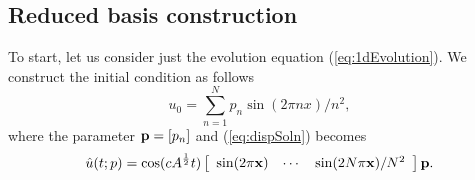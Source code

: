 %
%
%

\subsection{Reduced basis construction}
To start, let us consider just the evolution equation (\ref{eq:1dEvolution}). We construct the initial condition as follows
\begin{equation}
\label{eq:Exp2initcond}
u_0 = \sum_{n=1}^N p_n \sin(2\pi n x)/n^2,
\end{equation}
where the parameter ${\mathbf{p}}=[p_n]$ and (\ref{eq:dispSoln}) becomes
\begin{equation}
\hat{u}(t;p)=\cos(c A^{\frac{1}{2}}t)\left[ \begin{array}{ccc}
\sin(2\pi {\mathbf{x}}) & \cdots & \sin(2N \pi {\mathbf{x}})/N^2 
\end{array}
\right]{\mathbf{p}}.
\end{equation}

